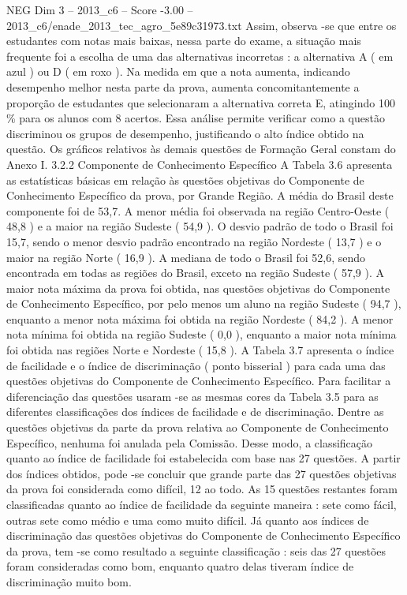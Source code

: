\begin{textsample}{NEG Dim 3 – 2013\_c6 – Score -3.00 – 2013\_c6/enade\_2013\_tec\_agro\_5e89c31973.txt}
Assim, observa -se que entre os estudantes com notas mais baixas, nessa parte do exame, a situação mais frequente foi a escolha de uma das alternativas incorretas : a alternativa A ( em azul ) ou D ( em roxo ).
Na medida em que a nota aumenta, indicando desempenho melhor nesta parte da prova, aumenta concomitantemente a proporção de estudantes que selecionaram a alternativa correta E, atingindo 100 \% para os alunos com 8 acertos.
Essa análise permite verificar como a questão discriminou os grupos de desempenho, justificando o alto índice obtido na questão.
Os gráficos relativos às demais questões de Formação Geral constam do Anexo I. 3.2.2 Componente de Conhecimento Específico A Tabela 3.6 apresenta as estatísticas básicas em relação às questões objetivas do Componente de Conhecimento Específico da prova, por Grande Região.
A média do Brasil deste componente foi de 53,7.
A menor média foi observada na região Centro-Oeste ( 48,8 ) e a maior na região Sudeste ( 54,9 ).
O desvio padrão de todo o Brasil foi 15,7, sendo o menor desvio padrão encontrado na região Nordeste ( 13,7 ) e o maior na região Norte ( 16,9 ).
A mediana de todo o Brasil foi 52,6, sendo encontrada em todas as regiões do Brasil, exceto na região Sudeste ( 57,9 ).
A maior nota máxima da prova foi obtida, nas questões objetivas do Componente de Conhecimento Específico, por pelo menos um aluno na região Sudeste ( 94,7 ), enquanto a menor nota máxima foi obtida na região Nordeste ( 84,2 ).
A menor nota mínima foi obtida na região Sudeste ( 0,0 ), enquanto a maior nota mínima foi obtida nas regiões Norte e Nordeste ( 15,8 ).
A Tabela 3.7 apresenta o índice de facilidade e o índice de discriminação ( ponto bisserial ) para cada uma das questões objetivas do Componente de Conhecimento Específico.
Para facilitar a diferenciação das questões usaram -se as mesmas cores da Tabela 3.5 para as diferentes classificações dos índices de facilidade e de discriminação.
Dentre as questões objetivas da parte da prova relativa ao Componente de Conhecimento Específico, nenhuma foi anulada pela Comissão.
Desse modo, a classificação quanto ao índice de facilidade foi estabelecida com base nas 27 questões.
A partir dos índices obtidos, pode -se concluir que grande parte das 27 questões objetivas da prova foi considerada como difícil, 12 ao todo.
As 15 questões restantes foram classificadas quanto ao índice de facilidade da seguinte maneira : sete como fácil, outras sete como médio e uma como muito difícil.
Já quanto aos índices de discriminação das questões objetivas do Componente de Conhecimento Específico da prova, tem -se como resultado a seguinte classificação : seis das 27 questões foram consideradas como bom, enquanto quatro delas tiveram índice de discriminação muito bom.

\end{textsample}
